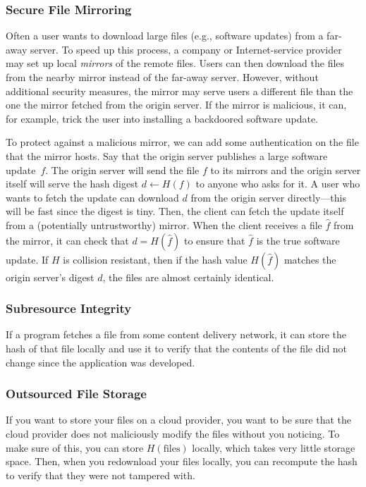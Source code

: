 \subsubsection{Secure File Mirroring}
Often a user wants to download large files (e.g., software updates) from a far-away server.
To speed up this process, a company or Internet-service provider may set up local \emph{mirrors}
of the remote files.
Users can then download the files from the nearby mirror instead of the far-away server.
However, without additional security measures, the mirror may 
serve users a different file than the one the mirror fetched from the origin server.
If the mirror is malicious, it can, for example, trick the user into installing
a backdoored software update.

To protect against a malicious mirror, we can add some authentication on the file that the mirror hosts.
Say that the origin server publishes a large software update~$f$.
The origin server will send the file $f$ to its mirrors and the origin
server itself will serve the hash digest $d\gets H(f)$ to anyone who asks for it.
A user who wants to fetch the update can download $d$ from the origin server directly---this
will be fast since the digest is tiny.
Then, the client can fetch the update itself from a (potentially untrustworthy) mirror.
When the client receives a file $\hat f$ from the mirror, it can check that $d = H(\hat f)$
to ensure that $\hat f$ is the true software update.
If $H$ is collision resistant, then if the hash value $H(\hat f)$ matches the origin server's digest $d$,
the files are almost certainly identical.

\subsubsection{Subresource Integrity}
If a program fetches a file from some content
delivery network, it can store the hash of that
file locally and use it to verify that the
contents of the file did not change since the
application was developed.

\subsubsection{Outsourced File Storage}
If you want to store your files on a cloud
provider, you want to be sure that the cloud
provider does not maliciously modify the files
without you noticing. To make sure of this, you
can store $H(\text{files})$ locally, which takes
very little storage space. Then, when you
redownload your files locally, you can recompute
the hash to verify that they were not tampered
with.

